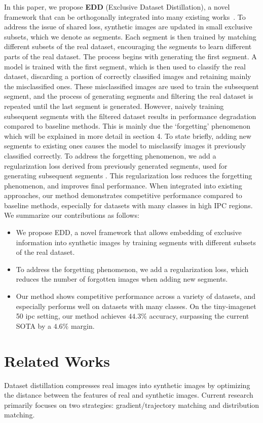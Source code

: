 \documentclass{article}
\theoremstyle{plain}
\theoremstyle{definition}
\theoremstyle{remark}
\begin{document}
In this paper, we propose \textbf{EDD} (Exclusive Dataset Distillation), a novel framework that can be orthogonally integrated into many existing works~\cite{}. To address the issue of shared loss, synthetic images are updated in small exclusive subsets, which we denote as segments. Each segment is then trained by matching different subsets of the real dataset, encouraging the segments to learn different parts of the real dataset. The process begins with generating the first segment. A model is trained with the first segment, which is then used to classify the real dataset, discarding a portion of correctly classified images and retaining mainly the misclassified ones. These misclassified images are used to train the subsequent segment, and the process of generating segments and filtering the real dataset is repeated until the last segment is generated. However, naively training subsequent segments with the filtered dataset results in performance degradation compared to baseline methods. This is mainly due the `forgetting' phenomenon~\cite{} which will be explained in more detail in section 4. To state briefly, adding new segments to existing ones causes the model to misclassify images it previously classified correctly. To address the forgetting phenomenon, we add a regularization loss derived from previously generated segments, used for generating subsequent segments . This regularization loss reduces the forgetting phenomenon, and improves final performance. When integrated into existing approaches, our method demonstrates competitive performance compared to baseline methods, especially for datasets with many classes in high IPC regions. We summarize our contributions as follows:
\begin{itemize}
    \item We propose EDD, a novel framework that allows embedding of exclusive information into synthetic images by training segments with different subsets of the real dataset.
    \item To address the forgetting phenomenon, we add a regularization loss, which reduces the number of forgotten images when adding new segments.
    \item Our method shows competitive performance across a variety of datasets, and especially performs well on datasets with many classes. On the tiny-imagenet 50 ipc setting, our method achieves $44.3\%$ accuracy, surpassing the current SOTA by a $4.6\%$ margin.
\end{itemize}


\section{Related Works}
Dataset distillation compresses real images into synthetic images by optimizing the distance between the features of real and synthetic images. Current research primarily focuses on two strategies: gradient/trajectory matching and distribution matching.
\end{document}
